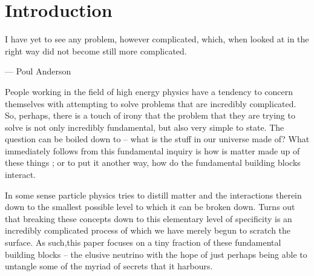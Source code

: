 \section{Introduction}

I have yet to see any problem, however complicated, which, when looked at in the right way did not become still more complicated.

\begin{flushright}--- Poul Anderson\end{flushright}

People working in the field of high energy physics have a tendency to concern themselves with attempting to solve problems that are incredibly complicated.
So, perhaps, there is a touch of irony that the problem that they are trying to solve is not only incredibly fundamental, but also very simple to state.
The question can be boiled down to -- what is the stuff in our universe made of?
What immediately follows from this fundamental inquiry is how is matter made up of these things ; or to put it another way, how do the fundamental building blocks interact.

In some sense particle physics tries to distill matter and the interactions therein down to the smallest possible level to which it can be broken down.
Turns out that breaking these concepts down to this elementary level of specificity is an incredibly complicated process of which we have merely begun to scratch the surface.  As such,this paper focuses on a tiny fraction of these fundamental building blocks -- the elusive neutrino with the hope of just perhaps being able to untangle some of the myriad of secrets that it harbours.

























